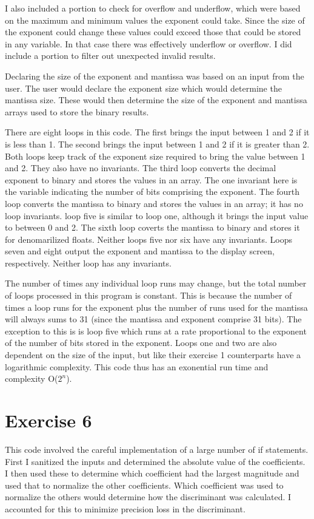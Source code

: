 \documentclass{article}
\begin{document}
I also included a portion to check for overflow and underflow, which were based on the maximum and minimum values the exponent could take. Since the size of the exponent could change these values could exceed those that could be stored in any variable. In that case there was effectively underflow or overflow. I did include a portion to filter out unexpected invalid results.

Declaring the size of the exponent and mantissa was based on an input from the user. The user would declare the exponent size which would determine the mantissa size. These would then determine the size of the exponent and mantissa arrays used to store the binary results.

There are eight loops in this code. The first brings the input between 1 and 2 if it is less than 1. The second brings the input between 1 and 2 if it is greater than 2. Both loops keep track of the exponent size required to bring the value between 1 and 2. They also have no invariants. The third loop converts the decimal exponent to binary and stores the values in an array. The one invariant here is the variable indicating the number of bits comprising the exponent. The fourth loop converts the mantissa to binary and stores the values in an array; it has no loop invariants. loop five is similar to loop one, although it brings the input value to between 0 and 2. The sixth loop coverts the mantissa to binary and stores it for denomarilized floats. Neither loops five nor six have any invariants. Loops seven and eight output the exponent and mantissa to the display screen, respectively. Neither loop has any invariants.

The number of times any individual loop runs may change, but the total number of loops processed in this program is constant. This is because the number of times a loop runs for the exponent plus the number of runs used for the mantissa will always sums to 31 (since the mantissa and exponent comprise 31 bits). The exception to this is is loop five which runs at a rate proportional to the exponent of the number of bits stored in the exponent. Loops one and two are also dependent on the size of the input, but like their exercise 1 counterparts have a logarithmic complexity. This code thus has an exonential run time and complexity O($2^n$).

\section{Exercise 6}
This code involved the careful implementation of a large number of if statements. First I sanitized the inputs and determined the absolute value of the coefficients. I then used these to determine which coefficient had the largest magnitude and used that to normalize the other coefficients. Which coefficient was used to normalize the others would determine how the discriminant was calculated. I accounted for this to minimize precision loss in the discriminant.
\end{document}
